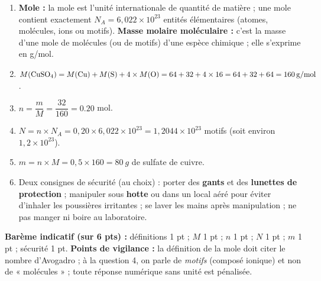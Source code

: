 \documentclass[11pt]{article}
\begin{document}
\begin{corrige}
\begin{enumerate}
\item \textbf{Mole :} la mole est l'unité internationale de quantité de matière ; une mole contient exactement $N_A = 6,022\times 10^{23}$ entités élémentaires (atomes, molécules, ions ou motifs).
\textbf{Masse molaire moléculaire :} c'est la masse d'une mole de molécules (ou de motifs) d'une espèce chimique ; elle s'exprime en \unit{g/mol}.
\item $M(\ce{CuSO4}) = M(\ce{Cu}) + M(\ce{S}) + 4\times M(\ce{O}) = 64 + 32 + 4\times 16 = 64 + 32 + 64 = \SI{160}{g/mol}$.
\item $n = \dfrac{m}{M} = \dfrac{32}{160} = \num{0,20}$ mol.
\item $N = n\times N_A = 0,20\times 6,022\times 10^{23} = 1,2044\times 10^{23}$ motifs  (soit environ $1,2\times 10^{23}$).
\item $m = n\times M = 0,5\times 160 = \SI{80}{g}$ de sulfate de cuivre.
\item Deux consignes de sécurité (au choix) : porter des \textbf{gants} et des \textbf{lunettes de protection} ; manipuler sous \textbf{hotte} ou dans un local aéré pour éviter d'inhaler les poussières irritantes ; se laver les mains après manipulation ; ne pas manger ni boire au laboratoire.
\end{enumerate}
\textbf{Barème indicatif (sur 6 pts) :} définitions 1 pt ; $M$ 1 pt ; $n$ 1 pt ; $N$ 1 pt ; $m$ 1 pt ; sécurité 1 pt.
\textbf{Points de vigilance :} la définition de la mole doit citer le nombre d'Avogadro ; à la question 4, on parle de \emph{motifs}  (composé ionique) et non de « molécules » ; toute réponse numérique sans unité est pénalisée.
\end{corrige}
\end{document}
